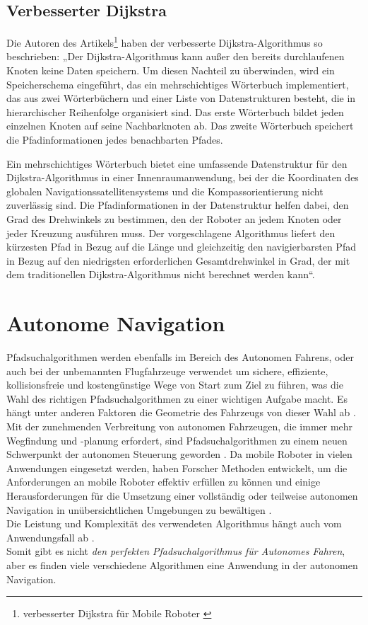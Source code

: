 \subsection{Verbesserter Dijkstra }
Die Autoren des Artikels\footnote{ verbesserter Dijkstra für Mobile Roboter \cite{Karur2021}} haben der verbesserte Dijkstra-Algorithmus so beschrieben:
„Der Dijkstra-Algorithmus kann außer den bereits durchlaufenen Knoten keine Daten speichern. Um diesen Nachteil zu überwinden, wird ein Speicherschema eingeführt, das ein mehrschichtiges Wörterbuch implementiert, das aus zwei Wörterbüchern und einer Liste von Datenstrukturen besteht, die in hierarchischer Reihenfolge organisiert sind. Das erste Wörterbuch bildet jeden einzelnen Knoten auf seine Nachbarknoten ab. Das zweite Wörterbuch speichert die Pfadinformationen jedes benachbarten Pfades.
\newline
\newline

Ein mehrschichtiges Wörterbuch bietet eine umfassende Datenstruktur für den Dijkstra-Algorithmus in einer Innenraumanwendung, bei der die Koordinaten des globalen Navigationssatellitensystems und die Kompassorientierung nicht zuverlässig sind. Die Pfadinformationen in der Datenstruktur helfen dabei, den Grad des Drehwinkels zu bestimmen, den der Roboter an jedem Knoten oder jeder Kreuzung ausführen muss. Der vorgeschlagene Algorithmus liefert den kürzesten Pfad in Bezug auf die Länge und gleichzeitig den navigierbarsten Pfad in Bezug auf den niedrigsten erforderlichen Gesamtdrehwinkel in Grad, der mit dem traditionellen Dijkstra-Algorithmus nicht berechnet werden kann“.

\section{Autonome Navigation}
\label{Autonome Navigation}

Pfadsuchalgorithmen werden ebenfalls im Bereich des Autonomen Fahrens, oder auch bei der unbemannten Flugfahrzeuge verwendet
um sichere, effiziente, kollisionsfreie und kostengünstige Wege von Start zum Ziel zu führen, was die Wahl des richtigen Pfadsuchalgorithmen
zu einer wichtigen Aufgabe macht. Es hängt unter anderen Faktoren die Geometrie des Fahrzeugs von dieser Wahl ab \cite{Karur:21}.
Mit der zunehmenden Verbreitung von autonomen Fahrzeugen, die immer mehr Wegfindung und -planung erfordert, sind Pfadsuchalgorithmen
zu einem neuen Schwerpunkt der autonomen Steuerung geworden \cite{Karur:21}.
Da mobile Roboter in vielen Anwendungen eingesetzt werden, haben Forscher Methoden entwickelt, um die 
Anforderungen an mobile Roboter effektiv erfüllen zu können und einige Herausforderungen für die Umsetzung einer vollständig oder
teilweise autonomen Navigation in unübersichtlichen Umgebungen zu bewältigen \cite{Karur:21}.
\noindent \\
Die Leistung und Komplexität des verwendeten Algorithmus hängt auch vom Anwendungsfall ab \cite{Karur:21}. \\
Somit gibt es nicht \emph{den perfekten Pfadsuchalgorithmus für Autonomes Fahren}, aber es finden viele verschiedene Algorithmen eine 
Anwendung in der autonomen Navigation.